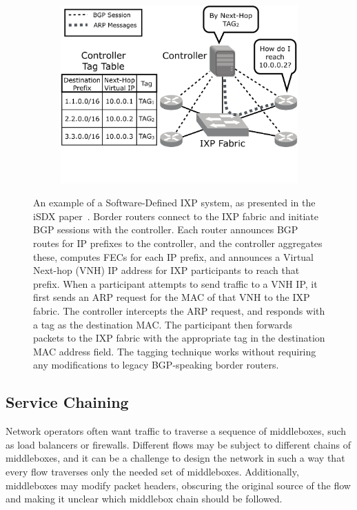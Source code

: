 \begin{figure}
\begin{minipage}{1\linewidth}
\begin{subfigure}[b]{0.96\linewidth}
\includegraphics[width=\linewidth,trim={0 5cm 0 0}]{figures/sdx_example}
\end{subfigure} 
\end{minipage} 
\caption{An example of a Software-Defined IXP system, as presented in
  the iSDX paper~\cite{isdx}. Border routers connect to the IXP fabric
  and initiate BGP sessions with the controller. Each router announces
  BGP routes for IP prefixes to the controller, and the controller
  aggregates these, computes FECs for each IP prefix, and announces a
  Virtual Next-hop (VNH) IP address for IXP participants to reach that
  prefix. When a participant attempts to send traffic to a VNH IP, it
  first sends an ARP request for the MAC of that VNH to the IXP
  fabric. The controller intercepts the ARP request, and responds with
  a tag as the destination MAC. The participant then forwards packets
  to the IXP fabric with the appropriate tag in the destination MAC
  address field.  The tagging technique works without requiring any
  modifications to legacy BGP-speaking border routers.}
\label{fig:sdx_example}
\end{figure}

\subsection{Service Chaining}
Network operators often want traffic to traverse a
sequence of middleboxes, such as load balancers or firewalls.  Different
flows may be subject to different chains of middleboxes, and it can be a
challenge to design the network in such a way that every flow traverses
only the needed set of middleboxes. Additionally, middleboxes may modify
packet headers, obscuring the original source of the flow and making it
unclear which middlebox chain should be followed.

